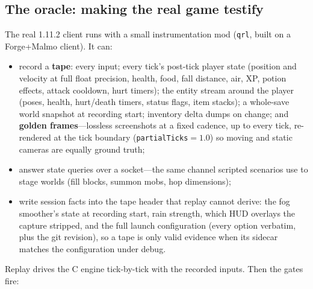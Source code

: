 \documentclass[11pt]{article}
\begin{document}
\subsection{The oracle: making the real game testify}
\label{sec:oracle}

The real 1.11.2 client runs with a small instrumentation mod (\texttt{qrl}, built on a Forge+Malmo client). It can:

\begin{itemize}
\item record a \textbf{tape}: every input; every tick's post-tick player state (position and velocity at full float precision, health, food, fall distance, air, XP, potion effects, attack cooldown, hurt timers); the entity stream around the player (poses, health, hurt/death timers, status flags, item stacks); a whole-save world snapshot at recording start; inventory delta dumps on change; and \textbf{golden frames}---lossless screenshots at a fixed cadence, up to every tick, re-rendered at the tick boundary (\texttt{partialTicks}$=1.0$) so moving and static cameras are equally ground truth;
\item answer state queries over a socket---the same channel scripted scenarios use to stage worlds (fill blocks, summon mobs, hop dimensions);
\item write session facts into the tape header that replay cannot derive: the fog smoother's state at recording start, rain strength, which HUD overlays the capture stripped, and the full launch configuration (every option verbatim, plus the git revision), so a tape is only valid evidence when its sidecar matches the configuration under debug.
\end{itemize}

Replay drives the C engine tick-by-tick with the recorded inputs. Then the gates fire:
\end{document}
